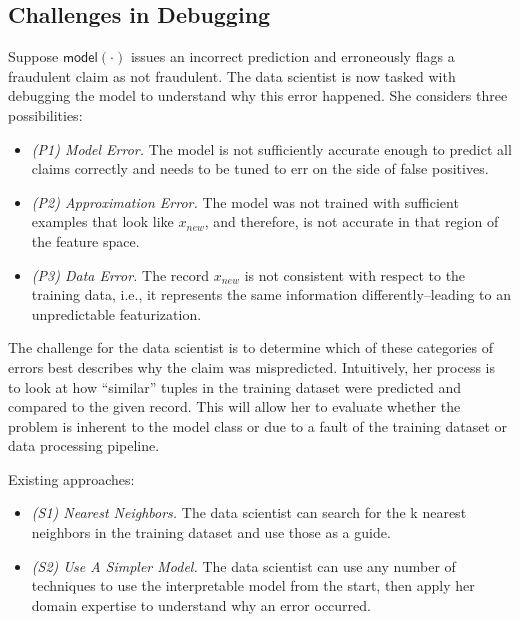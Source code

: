 \subsection{Challenges in Debugging}
Suppose $\textsf{model}(\cdot)$ issues an incorrect prediction and erroneously flags a fraudulent claim as not fraudulent. The data scientist is now tasked with debugging the model to understand why this error happened. 
She considers three possibilities: 
\begin{itemize}
\item \emph{(P1) Model Error.} The model is not sufficiently accurate enough to predict all claims correctly and needs to be tuned to err on the side of false positives.
\item \emph{(P2) Approximation Error.} The model was not trained with sufficient examples that look like $x_{new}$, and therefore, is not accurate in that region of the feature space.
\item \emph{(P3) Data Error.} The record $x_{new}$ is not consistent with respect to the training data, i.e., it represents the same information differently--leading to an unpredictable featurization.
\end{itemize}
The challenge for the data scientist is to determine which of these categories of errors best describes why the claim was mispredicted.
Intuitively, her process is to look at how ``similar'' tuples in the training dataset were predicted and compared to the given record. This will allow her to evaluate whether the problem is inherent to the model class or due to a fault of the training dataset or data processing pipeline. 

Existing approaches: 
\begin{itemize}
\item \emph{(S1) Nearest Neighbors. } The data scientist can search for the k nearest neighbors in the training dataset and use those as a guide.

\item \emph{(S2) Use A Simpler Model.} The data scientist can use any number of techniques to use the interpretable model from the start, then apply her domain expertise to understand why an error occurred.
\end{itemize}

